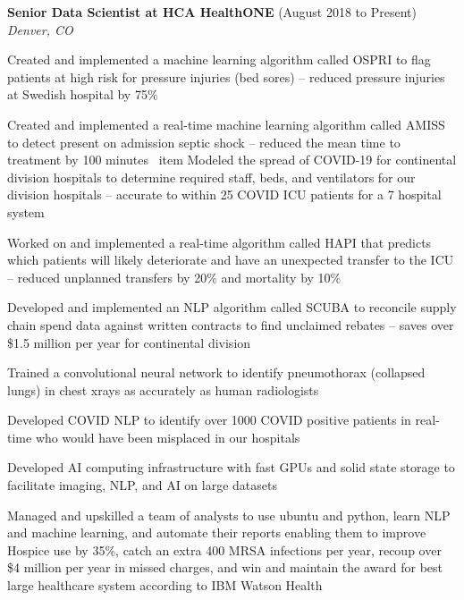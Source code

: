 \begin{resume}
    {\bf Senior Data Scientist at HCA HealthONE} (August 2018 to Present)\\\vspace{2mm}%
    \textit{Denver, CO}
    \begin{stuff}
        \vspace*{1mm}
            \item Created and implemented a machine learning algorithm called OSPRI to flag patients at high risk for pressure injuries (bed sores) -- reduced pressure injuries at Swedish hospital by 75\%
            \item Created and implemented a real-time machine learning algorithm called AMISS to detect present on admission septic shock -- reduced the mean time to treatment by 100 minutes
   \        item Modeled the spread of COVID-19 for continental division hospitals to determine required staff, beds, and ventilators for our division hospitals -- accurate to within 25 COVID ICU patients for a 7 hospital system
            \item Worked on and implemented a real-time algorithm called HAPI that predicts which patients will likely deteriorate and have an unexpected transfer to the ICU -- reduced unplanned transfers by 20\% and mortality by 10\%
            \item Developed and implemented an NLP algorithm called SCUBA to reconcile supply chain spend data against written contracts to find unclaimed rebates -- saves over \$1.5 million per year for continental division
            \item Trained a convolutional neural network to identify pneumothorax (collapsed lungs) in chest xrays as accurately as human radiologists
            \item Developed COVID NLP to identify over 1000 COVID positive patients in real-time who would have been misplaced in our hospitals
            \item Developed AI computing infrastructure with fast GPUs and solid state storage to facilitate imaging, NLP, and AI on large datasets
            \item Managed and upskilled a team of analysts to use ubuntu and python, learn NLP and machine learning, and automate their reports enabling them to improve Hospice use by 35\%, catch an extra 400 MRSA infections per year, recoup over \$4 million per year in missed charges, and win and maintain the award for best large healthcare system according to IBM Watson Health
    \end{stuff}


\end{resume}
